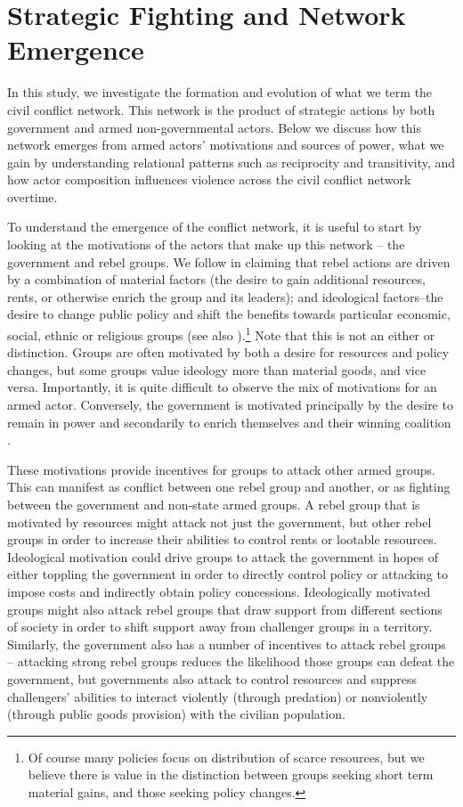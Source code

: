 \section*{Strategic Fighting and Network Emergence}

In this study, we investigate the formation and evolution of what we term the civil conflict network. This network is the product of strategic actions by both government and armed non-governmental actors. Below we discuss how this network emerges from armed actors' motivations and sources of power, what we gain by understanding relational patterns such as reciprocity and transitivity, and how actor composition influences violence across the civil conflict network overtime. 

To understand the emergence of the conflict network, it is useful to start by looking at the motivations of the actors that make up this network -- the government and rebel groups. We follow \citet{collier:hoeffler:2004} in claiming that rebel actions are driven by a combination of material factors (the desire to gain additional resources, rents, or otherwise enrich the group and its leaders); and ideological factors--the desire to change public policy and shift the benefits towards particular economic, social, ethnic or religious groups (see also \citealp{gurr:1970, regan:norton:2005, bodea:elbadawi:2007}).\footnote{Of course many policies focus on distribution of scarce resources, but we believe there is value in the distinction between groups seeking short term material gains, and those seeking policy changes.} Note that this is not an either or distinction. Groups are often motivated by both a desire for resources and policy changes, but some groups value ideology more than material goods, and vice versa. Importantly, it is quite difficult to observe the mix of motivations for an armed actor. Conversely, the government is motivated principally by the desire to remain in power and secondarily to enrich themselves and their winning coalition \citep{bdm:etal:2005,goemans:2000,acemoglu:robinson:2001}.

These motivations provide incentives for groups to attack other armed groups. This can manifest as conflict between one rebel group and another, or as fighting between the government and non-state armed groups. A rebel group that is motivated by resources might attack not just the government, but other rebel groups in order to increase their abilities to control rents or lootable resources. Ideological motivation could drive groups to attack the government in hopes of either toppling the government in order to directly control policy or attacking to impose costs and indirectly obtain policy concessions. Ideologically motivated groups might also attack rebel groups that draw support from different sections of society in order to shift support away from challenger groups in a territory. Similarly, the government also has a number of incentives to attack rebel groups -- attacking strong rebel groups reduces the likelihood those groups can defeat the government, but governments also attack to control resources and suppress challengers' abilities to interact violently (through predation) or nonviolently (through public goods provision) with the civilian population. 

